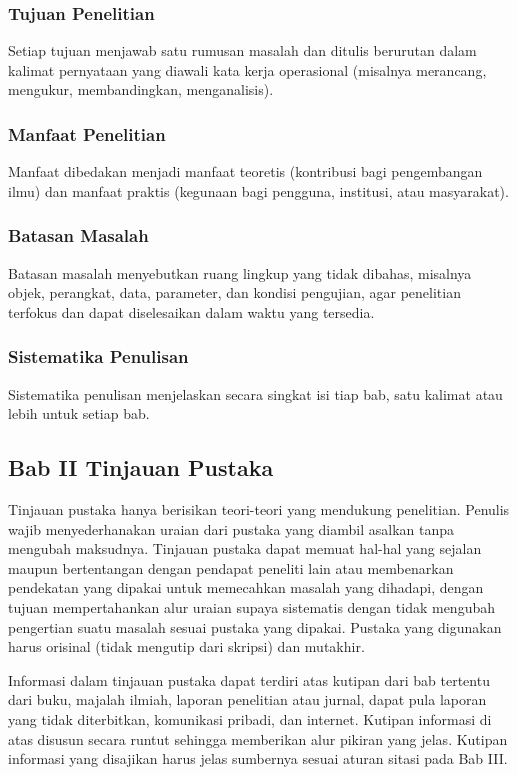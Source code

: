 \subsubsection{Tujuan Penelitian}
Setiap tujuan menjawab satu rumusan masalah dan ditulis berurutan dalam kalimat pernyataan yang diawali kata kerja operasional (misalnya merancang, mengukur, membandingkan, menganalisis).

\subsubsection{Manfaat Penelitian}
Manfaat dibedakan menjadi manfaat teoretis (kontribusi bagi pengembangan ilmu) dan manfaat praktis (kegunaan bagi pengguna, institusi, atau masyarakat).

\subsubsection{Batasan Masalah}
Batasan masalah menyebutkan ruang lingkup yang tidak dibahas, misalnya objek, perangkat, data, parameter, dan kondisi pengujian, agar penelitian terfokus dan dapat diselesaikan dalam waktu yang tersedia.

\subsubsection{Sistematika Penulisan}
Sistematika penulisan menjelaskan secara singkat isi tiap bab, satu kalimat atau lebih untuk setiap bab.

\subsection{Bab II Tinjauan Pustaka}
Tinjauan pustaka hanya berisikan teori-teori yang mendukung penelitian. Penulis wajib menyederhanakan uraian dari pustaka yang diambil asalkan tanpa mengubah maksudnya. Tinjauan pustaka dapat memuat hal-hal yang sejalan maupun bertentangan dengan pendapat peneliti lain atau membenarkan pendekatan yang dipakai untuk memecahkan masalah yang dihadapi, dengan tujuan mempertahankan alur uraian supaya sistematis dengan tidak mengubah pengertian suatu masalah sesuai pustaka yang dipakai. Pustaka yang digunakan harus orisinal (tidak mengutip dari skripsi) dan mutakhir.

Informasi dalam tinjauan pustaka dapat terdiri atas kutipan dari bab tertentu dari buku, majalah ilmiah, laporan penelitian atau jurnal, dapat pula laporan yang tidak diterbitkan, komunikasi pribadi, dan internet. Kutipan informasi di atas disusun secara runtut sehingga memberikan alur pikiran yang jelas. Kutipan informasi yang disajikan harus jelas sumbernya sesuai aturan sitasi pada Bab III.


